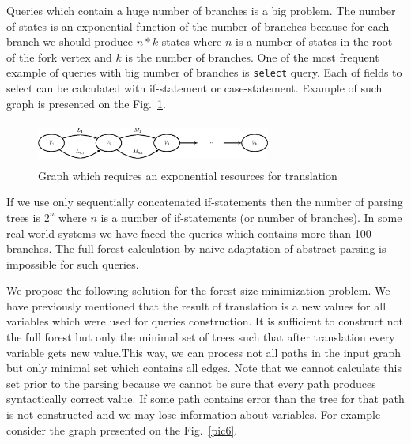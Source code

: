 Queries which contain a huge number of branches is a big problem. The number of states is an 
exponential function of the number of branches because for each branch we should produce $n*k$ 
states where $n$ is a number of states in the root of the fork vertex and $k$ is the number 
of branches. One of the most frequent example of queries with big number of branches 
is \verb|select| query. Each of fields to select can be calculated with if-statement 
or case-statement. Example of such graph is presented on the Fig.~\ref{pic5}.

\begin{figure}
    \begin{center}
        \includegraphics[width=7.7cm,height=1.4cm]{../../graphs/big_res.eps}
        \caption{Graph which requires an exponential resources for translation}
        \label{pic5}
    \end{center}
\end{figure}

If we use only sequentially concatenated if-statements then the number of parsing trees is $2^n$ 
where $n$ is a number of if-statements (or number of branches). In some real-world systems we 
have faced the queries which contains more than 100 branches. The full forest calculation by naive 
adaptation of abstract parsing is impossible for such queries. 



We propose the following solution for the forest size minimization problem. We have previously mentioned 
that the result of translation is a new values for all variables which were used for queries construction. 
It is sufficient to construct not the full forest but only the minimal set of trees such that after 
translation every variable gets new value.This way, we can process not all paths in the input graph 
but only minimal set which contains all edges. Note that we cannot calculate this set prior to the parsing 
because we cannot be sure that every path produces syntactically correct value. If some path contains 
error than the tree for that path is not constructed and we may lose information about variables. 
For example consider the graph presented on the Fig.~\ref{pic6}.

